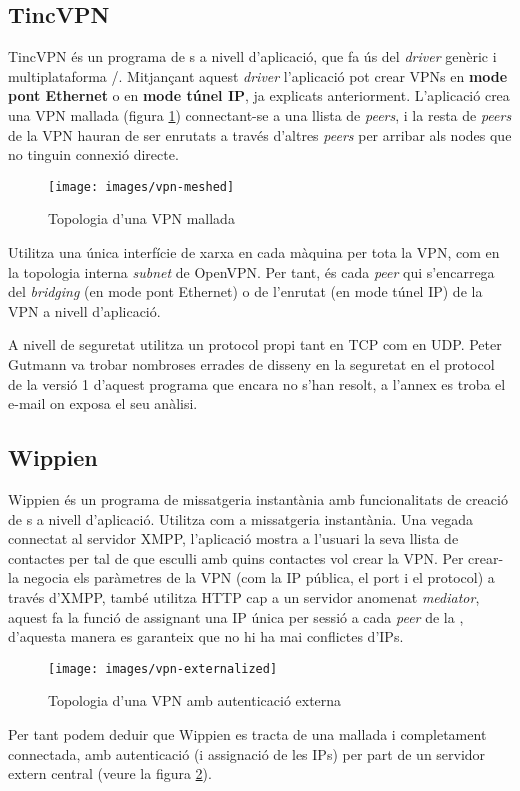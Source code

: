 \subsection{TincVPN}
TincVPN és un programa de s a nivell d'aplicació, que fa ús del \emph{driver} genèric i multiplataforma /. Mitjançant aquest \emph{driver} l'aplicació pot crear VPNs en \textbf{mode pont Ethernet} o en \textbf{mode túnel IP}, ja explicats anteriorment. L'aplicació crea una VPN mallada (figura \ref{F:vpn-meshed}) connectant-se a una llista de \emph{peers}, i la resta de \emph{peers} de la VPN hauran de ser enrutats a través d'altres \emph{peers} per arribar als nodes que no tinguin connexió directe.
\begin{figure}[htb]
\centering
\texttt{[image: images/vpn-meshed]}
\caption{Topologia d'una VPN mallada}
\label{F:vpn-meshed}
\end{figure}

Utilitza una única interfície de xarxa en cada màquina per tota la VPN, com en la topologia interna \emph{subnet} de OpenVPN. Per tant, és cada \emph{peer} qui s'encarrega del \emph{bridging} (en mode pont Ethernet) o de l'enrutat (en mode túnel IP) de la VPN a nivell d'aplicació.

A nivell de seguretat utilitza un protocol propi tant en TCP com en UDP. Peter Gutmann va trobar nombroses errades de disseny en la seguretat en el protocol de la versió 1 d'aquest programa que encara no s'han resolt, a l'annex  es troba el e-mail on exposa el seu anàlisi.

\subsection{Wippien}
Wippien és un programa de missatgeria instantània amb funcionalitats de creació de s a nivell d'aplicació. Utilitza  com a missatgeria instantània. Una vegada connectat al servidor XMPP, l'aplicació mostra a l'usuari la seva llista de contactes per tal de que esculli amb quins contactes vol crear la VPN. Per crear-la negocia els paràmetres de la VPN (com la IP pública, el port i el protocol) a través d'XMPP, també utilitza HTTP cap a un servidor anomenat \emph{mediator}, aquest fa la funció de  assignant una IP única per sessió a cada \emph{peer} de la , d'aquesta manera es garanteix que no hi ha mai conflictes d'IPs.
\begin{figure}[htb]
\centering
\texttt{[image: images/vpn-externalized]}
\caption{Topologia d'una VPN amb autenticació externa}
\label{F:vpn-externalized}
\end{figure}
Per tant podem deduir que Wippien es tracta de una  mallada i completament connectada, amb autenticació (i assignació de les IPs) per part de un servidor extern central (veure la figura \ref{F:vpn-externalized}).

